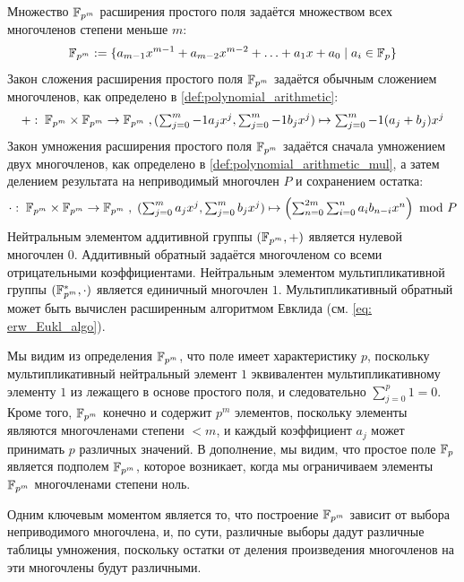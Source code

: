 Множество $\mathbb{F}_{p^m}$ расширения простого поля задаётся множеством всех многочленов степени меньше $m$:
\begin{equation}
\label{eq:prime-extension-field}
\mathbb{F}_{p^m}:= \{a_{m-1} x^{m-1}+a_{m-2}x^{m-2}+\ldots+a_1 x+a_0\;|\; a_i\in \mathbb{F}_p\}
\end{equation}
Закон сложения расширения простого поля $\mathbb{F}_{p^m}$ задаётся обычным сложением многочленов, как определено в \eqref{def:polynomial_arithmetic}:
\begin{equation}
+:\; \mathbb{F}_{p^m}\times \mathbb{F}_{p^m} \to \mathbb{F}_{p^m}\; , \textstyle (\sum_{j=0}^m-1 a_j x^j,\sum_{j=0}^m-1 b_j x^j)\mapsto \sum_{j=0}^m-1 (a_j+b_j) x^j
\end{equation}
Закон умножения расширения простого поля $\mathbb{F}_{p^m}$ задаётся сначала умножением двух многочленов, как определено в \eqref{def:polynomial_arithmetic_mul}, а затем делением результата на неприводимый многочлен $P$ и сохранением остатка:
\begin{equation}
\cdot : \; \mathbb{F}_{p^m}\times \mathbb{F}_{p^m} \to \mathbb{F}_{p^m}\; , \textstyle\; (\sum_{j=0}^m a_j x^j,\sum_{j=0}^m b_j x^j)\mapsto \left(\sum _{n = 0} ^{2m} \sum _{i = 0} ^{n}{a} _{i }{{b} _{n-i}}{x} ^{n}\right) \text{ mod } P
\end{equation}
Нейтральным элементом аддитивной группы $(\mathbb{F}_{p^m},+)$ является нулевой многочлен $0$. Аддитивный обратный задаётся многочленом со всеми отрицательными коэффициентами. Нейтральным элементом мультипликативной группы $(\mathbb{F}^*_{p^m},\cdot)$ является единичный многочлен $1$. Мультипликативный обратный может быть вычислен расширенным алгоритмом Евклида (см. \ref{eq: erw_Eukl_algo}).

Мы видим из определения $\mathbb{F}_{p^m}$, что поле имеет характеристику $p$, поскольку мультипликативный нейтральный элемент $1$ эквивалентен мультипликативному элементу $1$ из лежащего в основе простого поля, и следовательно $\sum_{j=0}^p 1=0$. Кроме того, $\mathbb{F}_{p^m}$ конечно и содержит $p^m$ элементов, поскольку элементы являются многочленами степени $<m$, и каждый коэффициент $a_j$ может принимать $p$ различных значений. В дополнение, мы видим, что простое поле $\mathbb{F}_p$ является подполем $\mathbb{F}_{p^m}$, которое возникает, когда мы ограничиваем элементы $\mathbb{F}_{p^m}$ многочленами степени ноль.

Одним ключевым моментом является то, что построение $\mathbb{F}_{p^m}$ зависит от выбора неприводимого многочлена, и, по сути, различные выборы дадут различные таблицы умножения, поскольку остатки от деления произведения многочленов на эти многочлены будут различными.


